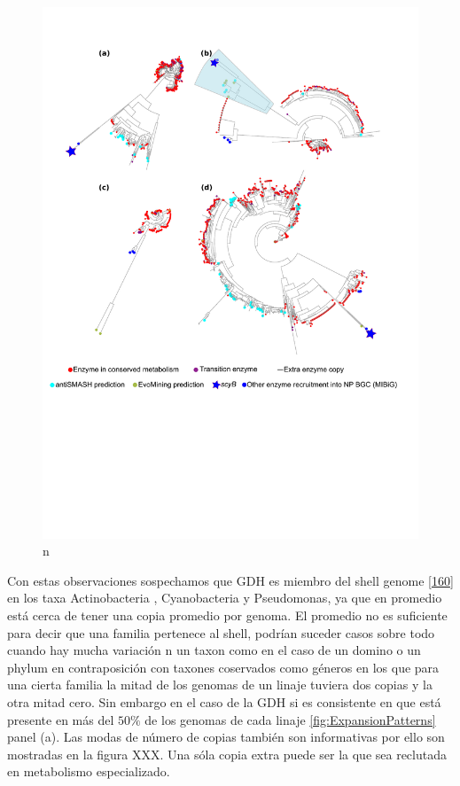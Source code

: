 \documentclass[12pt,twoside]{reedthesis}
\begin{document}
  \begin{figure}[h!tbp]
  \centering
  \includegraphics[angle = 0,scale = .8]{chapter2/FigurasPaper/Figure4.pdf}
  \caption[EvoMining en cuatro linajes genómicos]{\footnotesize{n}}
  \label{fig:GenomicLinajes}
  \end{figure}
  
  Con estas observaciones sospechamos que GDH es miembro del shell genome
  {[}\protect\hyperlink{ref-koonin_genomics_2008}{160}{]} en los taxa
  Actinobacteria , Cyanobacteria y Pseudomonas, ya que en promedio está
  cerca de tener una copia promedio por genoma. El promedio no es
  suficiente para decir que una familia pertenece al shell, podrían
  suceder casos sobre todo cuando hay mucha variación n un taxon como en
  el caso de un domino o un phylum en contraposición con taxones
  coservados como géneros en los que para una cierta familia la mitad de
  los genomas de un linaje tuviera dos copias y la otra mitad cero. Sin
  embargo en el caso de la GDH si es consistente en que está presente en
  más del \(50\%\) de los genomas de cada linaje
  \autoref{fig:ExpansionPatterns} panel (a). Las modas de número de copias
  también son informativas por ello son mostradas en la figura XXX. Una
  sóla copia extra puede ser la que sea reclutada en metabolismo
  especializado.
  
\end{document}

